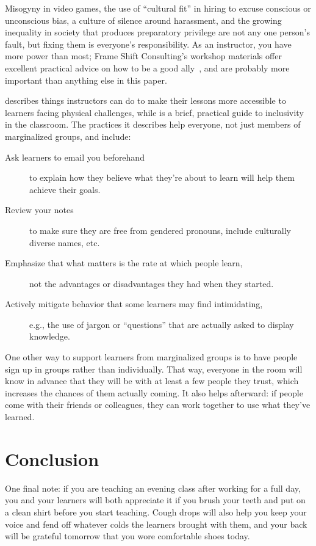 \documentclass[10pt,letterpaper]{article}
\begin{document}
Misogyny in video games,
the use of ``cultural fit'' in hiring to excuse conscious or unconscious bias,
a culture of silence around harassment,
and the growing inequality in society that produces preparatory privilege
are not any one person's fault,
but fixing them is everyone's responsibility.
As an instructor,
you have more power than most;
Frame Shift Consulting's workshop materials offer excellent practical advice on how to be a good ally~\cite{Auro2019},
and are probably more important than anything else in this paper.

\cite{Burg2015} describes things instructors can do to make their lessons more accessible
to learners facing physical challenges,
while \cite{Lee2017} is a brief, practical guide to inclusivity in the classroom.
The practices it describes help everyone,
not just members of marginalized groups,
and include:

\begin{description}

\item[Ask learners to email you beforehand]
  to explain how they believe what they're about to learn will help them achieve their goals.

\item[Review your notes]
  to make sure they are free from gendered pronouns, include culturally diverse names, etc.

\item[Emphasize that what matters is the rate at which people learn,]
  not the advantages or disadvantages they had when they started.

\item[Actively mitigate behavior that some learners may find intimidating,]
  e.g., the use of jargon or ``questions'' that are actually asked to display knowledge.

\end{description}

One other way to support learners from marginalized groups is
to have people sign up in groups rather than individually.
That way,
everyone in the room will know in advance that they will be with at least a few people they trust,
which increases the chances of them actually coming.
It also helps afterward:
if people come with their friends or colleagues,
they can work together to use what they've learned.

\section*{Conclusion}

One final note:
if you are teaching an evening class after working for a full day,
you and your learners will both appreciate it if you brush your teeth and put on a clean shirt
before you start teaching.
Cough drops will also help you keep your voice
and fend off whatever colds the learners brought with them,
and your back will be grateful tomorrow that you wore comfortable shoes today.


\end{document}
